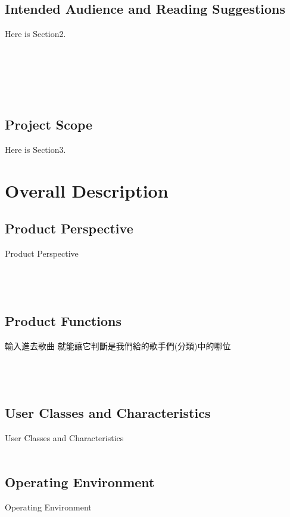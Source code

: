 \documentclass{article}
\begin{document}
\begin{CJK}{UTF8}{bkai}
\subsection{\Large Intended Audience and Reading Suggestions\\}
\large Here is Section2.\\\\\\\\\\\\
\subsection{Project Scope\\}
Here is Section3.
\newpage


\section{\huge\bf \color{blue}  Overall Description\\}

\subsection{\Large Product Perspective\\}
 \large Product Perspective\\\\\\\\
\subsection{\Large Product Functions}
\large 輸入進去歌曲 就能讓它判斷是我們給的歌手們(分類)中的哪位\\\\\\\\

\subsection{\Large User Classes and Characteristics\\}
  \Large User Classes and Characteristics\\\\
\newpage
\subsection{\Large Operating Environment \\}
 \Large Operating Environment 
\newpage


\end{CJK}
\end{document}

